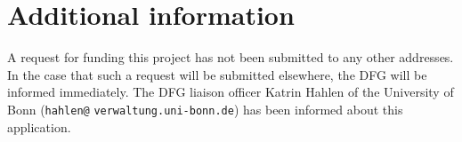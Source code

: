 \documentclass[a4paper,12pt]{article}
\begin{document}



\section{Additional information}

A request for funding this project has not been submitted to any other addresses. In the case that such a request will be submitted elsewhere, the DFG will be informed immediately. The DFG liaison officer Katrin Hahlen of the University of Bonn (\texttt{hahlen@} \texttt{verwaltung.uni-bonn.de}) has been informed about this application.
\end{document}
